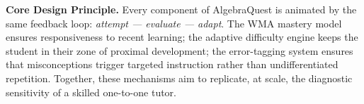 \documentclass[12pt,a4paper]{article}
\begin{document}
\bigskip

\begin{mdframed}[linecolor=primaryblue!60, linewidth=1pt,
                 innerleftmargin=12pt, innerrightmargin=12pt,
                 innertopmargin=10pt, innerbottommargin=10pt]
  \textbf{Core Design Principle.}\quad
  Every component of AlgebraQuest is animated by the same feedback loop:
  \emph{attempt — evaluate — adapt}.  The WMA mastery model ensures
  responsiveness to recent learning; the adaptive difficulty engine keeps the
  student in their zone of proximal development; the error-tagging system
  ensures that misconceptions trigger targeted instruction rather than
  undifferentiated repetition.  Together, these mechanisms aim to replicate,
  at scale, the diagnostic sensitivity of a skilled one-to-one tutor.
\end{mdframed}
\end{document}
